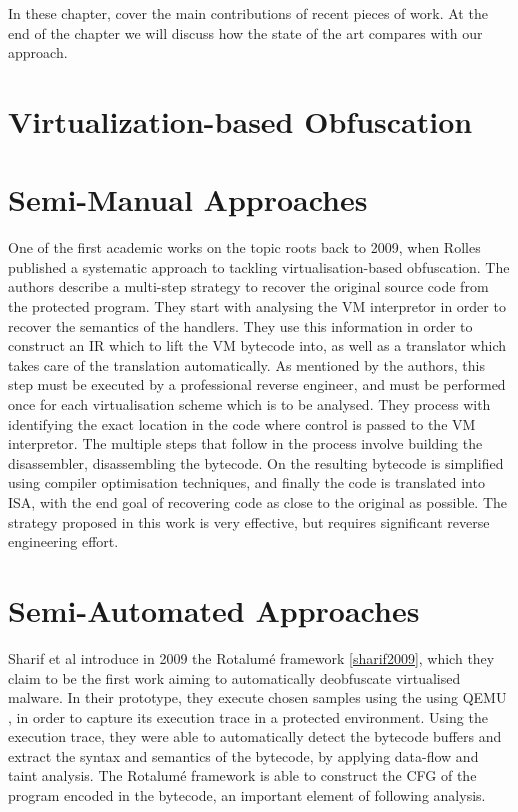 
In these chapter, cover the main contributions of recent pieces of work. At the end of the chapter we will discuss how the state of the art compares with our approach.

\section{Virtualization-based Obfuscation}

\section{Semi-Manual Approaches}

One of the first academic works on the topic roots back to 2009, when Rolles \cite{rolles2009unpacking} published a systematic approach to tackling virtualisation-based obfuscation. The authors describe a multi-step strategy to recover the original source code from the protected program. They start with analysing the \gls{VM} interpretor in order to recover the semantics of the handlers. They use this information in order to construct an \gls{IR} which to lift the \gls{VM} bytecode into, as well as a translator which takes care of the translation automatically. As mentioned by the authors, this step must be executed by a professional reverse engineer, and must be performed once for each virtualisation scheme which is to be analysed. They process with identifying the exact location in the code where control is passed to the \gls{VM} interpretor. The multiple steps that follow in the process involve building the disassembler, disassembling the bytecode. On the resulting bytecode is simplified using compiler optimisation techniques, and finally the code is translated into  \gls{ISA}, with the end goal of recovering code as close to the original as possible. The strategy proposed in this work is very effective, but requires significant reverse engineering effort.

\section{Semi-Automated Approaches}

Sharif et al introduce in 2009 the Rotalumé framework \ref{sharif2009}, which they claim to be the first work aiming to automatically deobfuscate virtualised malware. In their prototype, they execute chosen samples using the using QEMU \cite{qemu}, in order to capture its execution trace in a protected environment. Using the execution trace, they were able to automatically detect the bytecode buffers and extract the syntax and semantics of the bytecode, by applying data-flow and taint analysis. The Rotalumé framework is able to construct the \gls{CFG} of the program encoded in the bytecode, an important element of following analysis.

